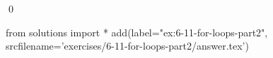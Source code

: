 
\begin{ex}
  \label{ex:6-11-for-loops-part2}
  
  \qed
\end{ex}
\begin{python0}
from solutions import *
add(label="ex:6-11-for-loops-part2",
    srcfilename='exercises/6-11-for-loops-part2/answer.tex')
\end{python0}
